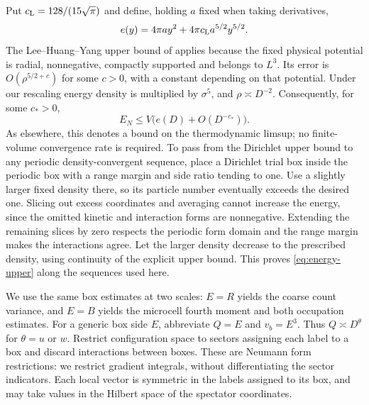 Put $c_{\rm L}=128/(15\sqrt\pi)$ and define, holding $a$ fixed when taking
derivatives,
\[
 e(y)=4\pi ay^2+4\pi c_{\rm L}a^{5/2}y^{5/2}.
\]
The Lee--Huang--Yang upper bound of
\cite[Theorem~1.1]{BCSUpper} applies because the fixed physical potential
is radial, nonnegative, compactly supported and belongs to $L^3$.
Its error is $O(\rho^{5/2+c})$ for some $c>0$, with a constant depending
on that potential.  Under our rescaling energy density is multiplied by
$\sigma^5$, and $\rho\asymp D^{-2}$.  Consequently, for some $c_*>0$,
\begin{equation}\label{eq:energy-upper}
 E_N\le V\bigl(e(D)+O(D^{-c_*})\bigr).
\end{equation}
As elsewhere, this denotes a bound on the thermodynamic limsup; no
finite-volume convergence rate is required.  To pass from the Dirichlet
upper bound to any periodic density-convergent sequence, place a
Dirichlet trial box inside the periodic box with a range margin and
side ratio tending to one.  Use a slightly larger fixed density there,
so its particle number eventually exceeds the desired one.  Slicing out
excess coordinates and averaging cannot increase the energy, since the
omitted kinetic and interaction forms are nonnegative.  Extending the
remaining slices by zero respects the periodic form domain and the range
margin makes the interactions agree.  Let the larger density decrease
to the prescribed density, using continuity of the explicit upper bound.
This proves \eqref{eq:energy-upper} along the sequences used here.

We use the same box estimates at two scales: $E=R$ yields the coarse
count variance, and $E=B$ yields the microcell fourth moment and both
occupation estimates.  For a generic box side $E$, abbreviate $Q=E$
and $v_b=E^3$.
Thus $Q\asymp D^\theta$ for $\theta=u$ or $w$.  Restrict configuration
space to sectors assigning each label to a box and discard interactions
between boxes.  These are Neumann form restrictions: we restrict gradient
integrals, without differentiating the sector indicators.  Each local
vector is symmetric in the labels assigned to its box, and may take
values in the Hilbert space of the spectator coordinates.

